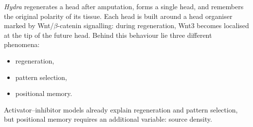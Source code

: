 \documentclass{article}
\newcommand{\bodyfont}{\fontsize{22}{27.5}\selectfont}
\newlength{\colw}\setlength{\colw}{38.6cm}
\newenvironment{rightcol}{\begin{minipage}[t]{\colw}\bodyfont}{\end{minipage}}
\begin{document}
\begin{rightcol}
  \vspace{2.3cm}
  {\raggedright \emph{Hydra} regenerates a head after amputation, forms a single head,
  and remembers the original polarity of its tissue. Each head is built around a head
  organiser marked by Wnt/$\beta$-catenin signalling: during regeneration, Wnt3 becomes
  localised at the tip of the future head. Behind this behaviour lie three different
  phenomena:\par}
  \begin{itemize}[itemsep=0.2em,topsep=0.4em]
    \item regeneration,
    \item pattern selection,
    \item positional memory.
  \end{itemize}
  {\raggedright Activator--inhibitor models already explain regeneration and pattern selection,
  but positional memory requires an additional variable: source density.\par}
\end{rightcol}
\end{document}
